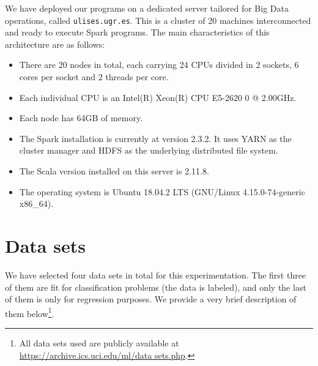 We have deployed our programs on a dedicated server tailored for Big Data operations, called \verb|ulises.ugr.es|. This is a cluster of 20 machines interconnected and ready to execute Spark programs. The main characteristics of this architecture are as follows:

\begin{itemize}
  \item There are 20 nodes in total, each carrying 24 CPUs divided in 2 sockets, 6 cores per socket and 2 threads per core.
  \item Each individual CPU is an Intel(R) Xeon(R) CPU E5-2620 0 @ 2.00GHz.
  \item Each node has 64GB of memory.
  \item The Spark installation is currently at version 2.3.2. It uses YARN as the cluster manager and HDFS as the underlying distributed file system.
  \item The Scala version installed on this server is 2.11.8.
  \item The operating system is Ubuntu 18.04.2 LTS (GNU/Linux 4.15.0-74-generic x86\_64).
\end{itemize}

\section{Data sets}

We have selected four data sets in total for this experimentation. The first three of them are fit for classification problems (the data is labeled), and only the last of them is only for regression purposes. We provide a very brief description of them below\footnote{All data sets used are publicly available at \url{https://archive.ics.uci.edu/ml/data sets.php}.}.

